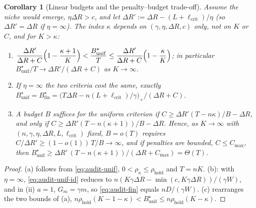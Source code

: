 \documentclass[11pt,a4paper]{article}
\newtheorem{corollary}[theorem]{Corollary}
\begin{document}
\begin{corollary}[Linear budgets and the penalty--budget trade-off]
\label{cor:audit-tradeoff}
Assume the niche would emerge, $\eta\Delta R>c$, and let
$\Delta R':=\Delta R-(L+\ell_{\mathrm{crit}})/\eta$ (so $\Delta R'=\Delta R$ if
$\eta=\infty$). The index $\kappa$ depends on $(\gamma,\eta,\Delta R,c)$ only,
not on $K$ or $C$, and for $K>\kappa$:
\begin{enumerate}
\item[\textup{(a)}] $\displaystyle
 \frac{\Delta R'}{\Delta R+C}\Bigl(1-\frac{\kappa+1}{K}\Bigr)<
 \frac{B^\star_{\mathrm{unif}}}{T}\le\frac{\Delta R'}{\Delta R+C}\Bigl(1-\frac{\kappa}{K}\Bigr)$;
 in particular $B^\star_{\mathrm{unif}}/T\to\Delta R'/(\Delta R+C)$ as
 $K\to\infty$.
\item[\textup{(b)}] If $\eta=\infty$ the two criteria cost the same, exactly
 $B^\star_{\mathrm{unif}}=B^\star_{\mathrm{fin}}
 =\bigl(T\Delta R-n(L+\ell_{\mathrm{crit}})/\gamma\bigr)_+/(\Delta R+C)$.
\item[\textup{(c)}] A budget $B$ suffices for the uniform criterion if
 $C\ge\Delta R'(T-n\kappa)/B-\Delta R$, and only if
 $C\ge\Delta R'(T-n(\kappa+1))/B-\Delta R$. Hence, as $K\to\infty$ with
 $(n,\gamma,\eta,\Delta R,L,\ell_{\mathrm{crit}})$ fixed, $B=o(T)$ requires
 $C/\Delta R'\ge(1-o(1))\,T/B\to\infty$, and if penalties are bounded,
 $C\le C_{\max}$, then
 $B^\star_{\mathrm{unif}}\ge\Delta R'\,(T-n(\kappa+1))/(\Delta R+C_{\max})=\Theta(T)$.
\end{enumerate}
\end{corollary}
\begin{proof}
(a) follows from \eqref{eq:audit-unif}, $0<\rho_\kappa\le\rho_{\mathrm{hold}}$
and $T=nK$. (b): with $\eta=\infty$, \eqref{eq:audit-unif-id} reduces to
$n(K\gamma\Delta R-\min(c,K\gamma\Delta R))/(\gamma W)$, and in (ii) $a=1$,
$G_m=\gamma m$, so \eqref{eq:audit-fin} equals $nD/(\gamma W)$. (c) rearranges
the two bounds of (a), $n\rho_{\mathrm{hold}}(K-1-\kappa)<B^\star_{\mathrm{unif}}
\le n\rho_{\mathrm{hold}}(K-\kappa)$.
\end{proof}
\end{document}
